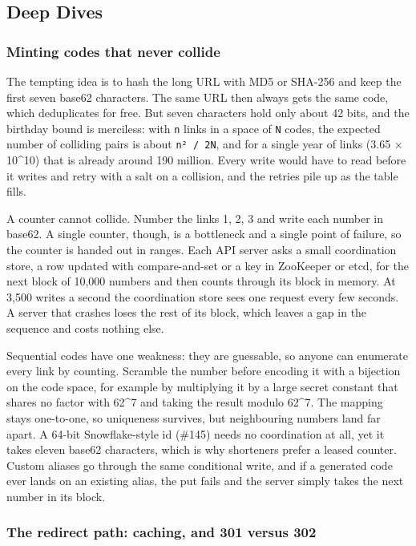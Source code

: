 \documentclass[
  letterpaper,
  oneside,
  11pt,
  openany]{scrbook}
\begin{document}
\subsection{Deep Dives}\label{deep-dives}

\subsubsection{Minting codes that never
collide}\label{minting-codes-that-never-collide}

The tempting idea is to hash the long URL with MD5 or SHA-256 and keep
the first seven base62 characters. The same URL then always gets the
same code, which deduplicates for free. But seven characters hold only
about 42 bits, and the birthday bound is merciless: with \texttt{n}
links in a space of \texttt{N} codes, the expected number of colliding
pairs is about \texttt{n²\ /\ 2N}, and for a single year of links (3.65
× 10\^{}10) that is already around 190 million. Every write would have
to read before it writes and retry with a salt on a collision, and the
retries pile up as the table fills.

A counter cannot collide. Number the links 1, 2, 3 and write each number
in base62. A single counter, though, is a bottleneck and a single point
of failure, so the counter is handed out in ranges. Each API server asks
a small coordination store, a row updated with compare-and-set or a key
in ZooKeeper or etcd, for the next block of 10,000 numbers and then
counts through its block in memory. At 3,500 writes a second the
coordination store sees one request every few seconds. A server that
crashes loses the rest of its block, which leaves a gap in the sequence
and costs nothing else.

Sequential codes have one weakness: they are guessable, so anyone can
enumerate every link by counting. Scramble the number before encoding it
with a bijection on the code space, for example by multiplying it by a
large secret constant that shares no factor with 62\^{}7 and taking the
result modulo 62\^{}7. The mapping stays one-to-one, so uniqueness
survives, but neighbouring numbers land far apart. A 64-bit
Snowflake-style id (\#145) needs no coordination at all, yet it takes
eleven base62 characters, which is why shorteners prefer a leased
counter. Custom aliases go through the same conditional write, and if a
generated code ever lands on an existing alias, the put fails and the
server simply takes the next number in its block.

\subsubsection{The redirect path: caching, and 301 versus
302}\label{the-redirect-path-caching-and-301-versus-302}
\end{document}
